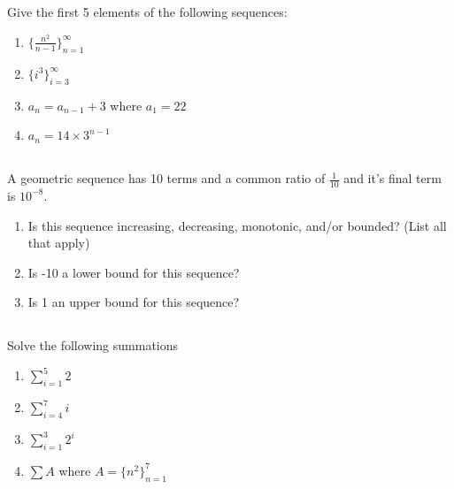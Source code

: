 \documentclass[twocolumn]{article}
\begin{document}
\subsection{}

    Give the first 5 elements of the following sequences:

    \begin{enumerate}
        \item $ \{ \frac{n^2}{n-1} \}^\infty_{n=1} $
        \item $ \{ i^3 \}^\infty_{i=3} $
        \item $ a_n = a_{n-1} + 3 $ where $a_1 = 22$
        \item $ a_n = 14 \times 3^{n-1} $
    \end{enumerate}

\subsection{}

    A geometric sequence has 10 terms and a common ratio of $\frac{1}{10}$ and it's final term is ${10^{-8}}$.

    \begin{enumerate}
        \item Is this sequence increasing, decreasing, monotonic, and/or bounded? (List all that apply)
        \item Is -10 a lower bound for this sequence?
        \item Is 1 an upper bound for this sequence?
    \end{enumerate}

\subsection{}

    Solve the following summations

    \begin{enumerate}
        \item $ \sum_{i=1}^{5} 2 $
        \item $ \sum_{i=4}^{7} i $
        \item $ \sum_{i=1}^{3} 2^i $
        \item $ \sum A $ where $ A = \{ n^2 \}^{7}_{n=1} $
    \end{enumerate}

\subsection{}
\end{document}
